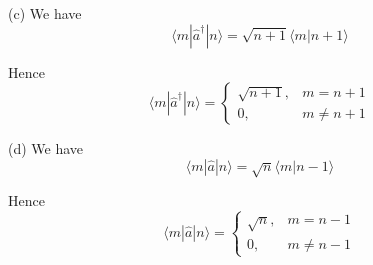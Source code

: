 \documentclass[12pt]{article}
\begin{document}
(c) We have
\begin{equation*}
\langle m|\hat a^\dag|n\rangle
=\sqrt{n+1}\langle m|n+1\rangle
\end{equation*}

Hence
\begin{equation*}
\langle m|\hat a^\dag|n\rangle
=\begin{cases}
\sqrt{n+1}, & m=n+1
\\
0, & m\ne n+1
\end{cases}
\end{equation*}

(d) We have
\begin{equation*}
\langle m|\hat a|n\rangle
=\sqrt n\langle m|n-1\rangle
\end{equation*}

Hence
\begin{equation*}
\langle m|\hat a|n\rangle
=\begin{cases}
\sqrt n, & m=n-1
\\
0, & m\ne n-1
\end{cases}
\end{equation*}
\end{document}
